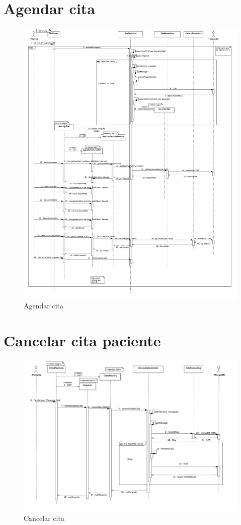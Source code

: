 \section{Agendar cita}
\begin{figure}[htbp!]
	\centering
	\includegraphics[width=1\textwidth]{uml/DiagramasSecuencia/AdrianGalindo/agendarCita}
	\caption{Agendar cita}
\end{figure}

\newpage

\section{Cancelar cita paciente}
\begin{figure}[htbp!]
	\centering
	\includegraphics[width=1\textwidth]{uml/DiagramasSecuencia/AdrianGalindo/cancelarCitaPaciente}
	\caption{Cancelar cita}
\end{figure}

